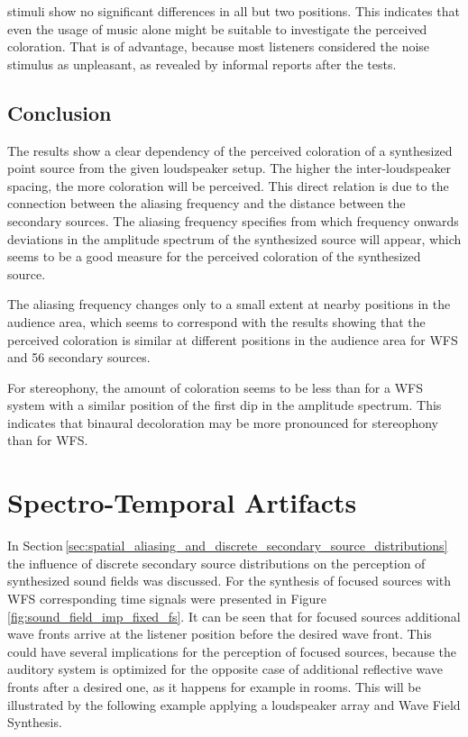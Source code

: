  stimuli show no significant differences in all but two
positions. This indicates that even the usage of music alone might
be suitable to investigate the perceived coloration. That is of advantage,
because most listeners considered the noise stimulus as unpleasant, as revealed by
informal reports after the tests.


\subsection{Conclusion}
\label{sec:coloration_conclusion}
%
The results show a clear dependency of the perceived coloration of a synthesized
point source from the given loudspeaker setup. The higher the inter-loudspeaker
spacing, the more coloration will be perceived. This direct relation is due to
the connection between the
aliasing frequency and the distance between the secondary sources. The aliasing
frequency specifies from which frequency onwards deviations in the amplitude spectrum
of the synthesized source will appear, which seems to be a good measure for the
perceived coloration of the synthesized source.

The aliasing frequency changes only to a small extent at nearby positions in the
audience area, which seems to correspond with the results showing that the perceived
coloration is similar at different positions in the audience area for \ac{WFS}
and 56 secondary sources.

For stereophony, the amount of coloration seems to be less than for a \ac{WFS}
system with a similar position of the first dip in the amplitude spectrum. This
indicates that binaural decoloration may be more pronounced for stereophony than
for \ac{WFS}.

\section{Spectro-Temporal Artifacts}
\label{sec:spectro_temporal_artifacts}

In Section\,\ref{sec:spatial_aliasing_and_discrete_secondary_source_distributions}
the influence of discrete secondary source distributions on the perception of
synthesized sound fields was discussed. For the synthesis of focused sources
with \ac{WFS} corresponding time signals were presented in
Figure\,\ref{fig:sound_field_imp_fixed_fs}. It can be seen that for focused
sources additional wave fronts arrive at the listener position before the
desired wave front. This could have several implications for the perception of
focused sources, because the auditory system is optimized for the opposite case of
additional reflective wave fronts after a desired one, as it happens for example
in rooms.
This will be illustrated by the following example applying
a loudspeaker array and Wave Field Synthesis.


